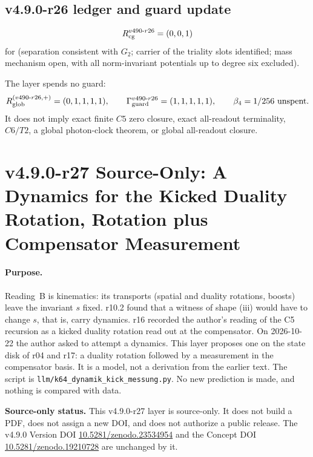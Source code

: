 \subsection*{v4.9.0-r26 ledger and guard update}
\label{subsec:v490-r26-ledger-guard}

\[
R_{\rm cg}^{v490\text{-}r26}=(0,0,1)
\]
for (separation consistent with \(G_2\); carrier of the triality slots identified; mass mechanism open, with all
norm-invariant potentials up to degree six excluded).

The layer spends no guard:
\[
R_{\rm glob}^{(v490\text{-}r26,+)}=(0,1,1,1,1),
\qquad
\Gamma_{\rm guard}^{v490\text{-}r26}=(1,1,1,1,1),
\qquad
\beta_4=1/256\ \text{unspent}.
\]
It does not imply exact finite \(C5\) zero closure, exact all-readout terminality,
\(C6/T2\), a global photon-clock theorem, or global all-readout closure.

\clearpage
\section*{v4.9.0-r27 Source-Only: A Dynamics for the Kicked Duality Rotation, Rotation plus Compensator Measurement}
\label{sec:v490-r27-kick-measurement-dynamics}

\paragraph{Purpose.}
Reading~B is kinematics: its transports (spatial and duality rotations, boosts) leave the invariant \(s\) fixed.  r10.2 found
that a witness of shape (iii) would have to change \(s\), that is, carry dynamics.  r16 recorded the author's reading of the C5
recursion as a kicked duality rotation read out at the compensator.  On 2026-10-22 the author asked to attempt a dynamics.  This
layer proposes one on the state disk of r04 and r17: a duality rotation followed by a measurement in the compensator basis.  It is
a model, not a derivation from the earlier text.  The script is \texttt{llm/k64\_dynamik\_kick\_messung.py}.  No new prediction is
made, and nothing is compared with data.

\noindent\textbf{Source-only status.}
This v4.9.0-r27 layer is source-only.  It does not build a PDF, does not assign a new DOI,
and does not authorize a public release.  The v4.9.0 Version DOI
\href{https://doi.org/10.5281/zenodo.23534954}{10.5281/zenodo.23534954} and the Concept DOI
\href{https://doi.org/10.5281/zenodo.19210728}{10.5281/zenodo.19210728} are unchanged by it.

